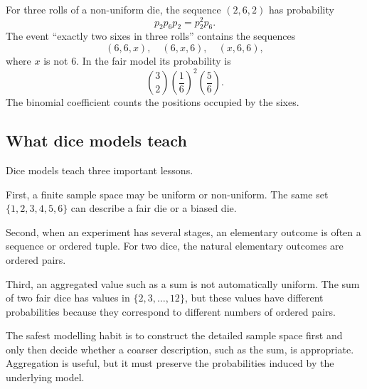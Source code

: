 \begin{examplebox}
For three rolls of a non-uniform die, the sequence \((2,6,2)\) has probability
\[
p_2p_6p_2=p_2^2p_6.
\]
The event ``exactly two sixes in three rolls'' contains the sequences
\[
(6,6,x),\quad (6,x,6),\quad (x,6,6),
\]
where \(x\) is not \(6\). In the fair model its probability is
\[
\binom32\left(\frac16\right)^2\left(\frac56\right).
\]
The binomial coefficient counts the positions occupied by the sixes.
\end{examplebox}

\subsection*{What dice models teach}

Dice models teach three important lessons.

First, a finite sample space may be uniform or non-uniform. The same set
\(\{1,2,3,4,5,6\}\) can describe a fair die or a biased die.

Second, when an experiment has several stages, an elementary outcome is often a
sequence or ordered tuple. For two dice, the natural elementary outcomes are
ordered pairs.

Third, an aggregated value such as a sum is not automatically uniform. The sum
of two fair dice has values in \(\{2,3,\ldots,12\}\), but these values have
different probabilities because they correspond to different numbers of ordered
pairs.

\begin{remarkbox}
The safest modelling habit is to construct the detailed sample space first and
only then decide whether a coarser description, such as the sum, is appropriate.
Aggregation is useful, but it must preserve the probabilities induced by the
underlying model.
\end{remarkbox}

